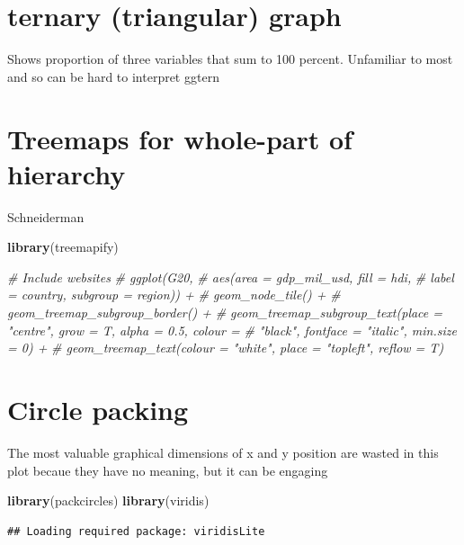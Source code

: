 \documentclass[]{krantz}
\makeatletter
\newenvironment{Shaded}{\begin{snugshade}}{\end{snugshade}}
\newcommand{\CommentTok}[1]{\textcolor[rgb]{0.56,0.35,0.01}{\textit{#1}}}
\newcommand{\KeywordTok}[1]{\textcolor[rgb]{0.13,0.29,0.53}{\textbf{#1}}}
\newcommand{\NormalTok}[1]{#1}
\newenvironment{kframe}{%
\medskip{}
\setlength{\fboxsep}{.8em}
 \def\at@end@of@kframe{}%
 \ifinner\ifhmode%
  \def\at@end@of@kframe{\end{minipage}}%
  \begin{minipage}{\columnwidth}%
 \fi\fi%
 \def\FrameCommand##1{\hskip\@totalleftmargin \hskip-\fboxsep
 \colorbox{shadecolor}{##1}\hskip-\fboxsep
     \hskip-\linewidth \hskip-\@totalleftmargin \hskip\columnwidth}%
 \MakeFramed {\advance\hsize-\width
   \@totalleftmargin\z@ \linewidth\hsize
   \@setminipage}}%
 {\par\unskip\endMakeFramed%
 \at@end@of@kframe}
\renewenvironment{Shaded}{\begin{kframe}}{\end{kframe}}
\makeatother
\begin{document}
\hypertarget{ternary-triangular-graph}{%
\section{ternary (triangular) graph}\label{ternary-triangular-graph}}

Shows proportion of three variables that sum to 100 percent. Unfamiliar to most and so can be hard to interpret
ggtern

\hypertarget{treemaps-for-whole-part-of-hierarchy}{%
\section{Treemaps for whole-part of hierarchy}\label{treemaps-for-whole-part-of-hierarchy}}

Schneiderman

\begin{Shaded}
\begin{Highlighting}[]
\KeywordTok{library}\NormalTok{(treemapify)}


\CommentTok{# Include websites}
\CommentTok{# ggplot(G20,}
\CommentTok{#        aes(area = gdp_mil_usd, fill = hdi,}
\CommentTok{#            label = country, subgroup = region)) +}
\CommentTok{#   geom_node_tile() +}
\CommentTok{#   geom_treemap_subgroup_border() +}
\CommentTok{#   geom_treemap_subgroup_text(place = "centre", grow = T, alpha = 0.5, colour =}
\CommentTok{#                              "black", fontface = "italic", min.size = 0) +}
\CommentTok{#   geom_treemap_text(colour = "white", place = "topleft", reflow = T)}
\end{Highlighting}
\end{Shaded}

\hypertarget{circle-packing}{%
\section{Circle packing}\label{circle-packing}}

The most valuable graphical dimensions of x and y position are wasted in this plot becaue they have no meaning, but it can be engaging

\begin{Shaded}
\begin{Highlighting}[]
\KeywordTok{library}\NormalTok{(packcircles)}
\KeywordTok{library}\NormalTok{(viridis)}
\end{Highlighting}
\end{Shaded}

\begin{verbatim}
## Loading required package: viridisLite
\end{verbatim}
\end{document}
